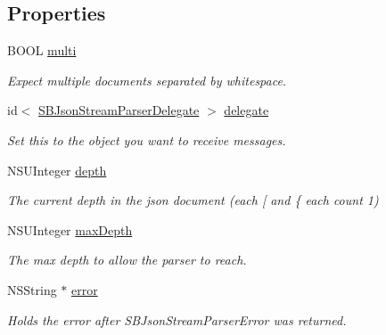 \subsection*{Properties}
\begin{DoxyCompactItemize}
\item 
BOOL \hyperlink{interface_s_b_json_stream_parser_ae526f90329122e9aa0a196672747b4ed}{multi}
\begin{DoxyCompactList}\small\item\em Expect multiple documents separated by whitespace. \item\end{DoxyCompactList}\item 
\hypertarget{interface_s_b_json_stream_parser_ae07425e91e0329ab3a1adeacf3122051}{
id$<$ \hyperlink{protocol_s_b_json_stream_parser_delegate-p}{SBJsonStreamParserDelegate} $>$ \hyperlink{interface_s_b_json_stream_parser_ae07425e91e0329ab3a1adeacf3122051}{delegate}}
\label{interface_s_b_json_stream_parser_ae07425e91e0329ab3a1adeacf3122051}

\begin{DoxyCompactList}\small\item\em Set this to the object you want to receive messages. \item\end{DoxyCompactList}\item 
\hypertarget{interface_s_b_json_stream_parser_aeaaa3e73d5d67488cbf1a31329a9b1e2}{
NSUInteger \hyperlink{interface_s_b_json_stream_parser_aeaaa3e73d5d67488cbf1a31329a9b1e2}{depth}}
\label{interface_s_b_json_stream_parser_aeaaa3e73d5d67488cbf1a31329a9b1e2}

\begin{DoxyCompactList}\small\item\em The current depth in the json document (each \mbox{[} and \{ each count 1) \item\end{DoxyCompactList}\item 
\hypertarget{interface_s_b_json_stream_parser_a1c6f49cb5dd676452994d96498bb5a3f}{
NSUInteger \hyperlink{interface_s_b_json_stream_parser_a1c6f49cb5dd676452994d96498bb5a3f}{maxDepth}}
\label{interface_s_b_json_stream_parser_a1c6f49cb5dd676452994d96498bb5a3f}

\begin{DoxyCompactList}\small\item\em The max depth to allow the parser to reach. \item\end{DoxyCompactList}\item 
\hypertarget{interface_s_b_json_stream_parser_a2345c486bc9f4de7bcd69eb7f6286f3b}{
NSString $\ast$ \hyperlink{interface_s_b_json_stream_parser_a2345c486bc9f4de7bcd69eb7f6286f3b}{error}}
\label{interface_s_b_json_stream_parser_a2345c486bc9f4de7bcd69eb7f6286f3b}

\begin{DoxyCompactList}\small\item\em Holds the error after SBJsonStreamParserError was returned. \item\end{DoxyCompactList}\end{DoxyCompactItemize}


